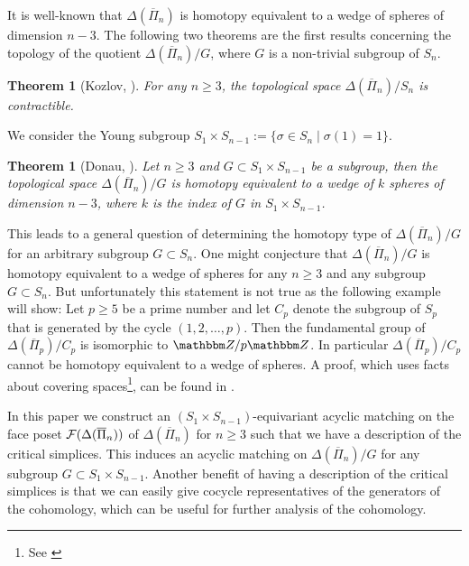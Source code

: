 \documentclass{elsarticle}
\newtheorem{thm}[df]{Theorem}
\def\Z{\mathbbm Z}
\begin{document}
It is well-known that $\Delta(\overline{\Pi}_n)$ is homotopy equivalent to a wedge of spheres of dimension $n-3$. The following two theorems are the first results concerning the topology of the quotient $\Delta(\overline{\Pi}_n)/G$, where $G$ is a non-trivial subgroup of $S_n$.
\begin{thm}[Kozlov, \cite{clmap}] %
For any $n\geq 3$, the topological space $\Delta(\overline{\Pi}_n)/S_n$ is contractible.
\end{thm}
We consider the Young subgroup $S_1\times S_{n-1}:=\{\sigma\in S_n\mid\sigma(1)=1\}$.
\begin{thm}[Donau, \cite{donau}]
\label{rdthm}
Let $n\geq3$ and $G\subset S_1\times S_{n-1}$ be a subgroup, then the topological space $\Delta(\overline{\Pi}_n)/G$ is homotopy equivalent to a wedge of $k$ spheres of dimension $n-3$, where $k$ is the index of $G$ in $S_1\times S_{n-1}$.
\end{thm}
This leads to a general question of determining the homotopy type of $\Delta(\overline{\Pi}_n)/G$ for an arbitrary subgroup $G\subset S_n$. One might conjecture that $\Delta(\overline{\Pi}_n)/G$ is homotopy equivalent to a wedge of spheres for any $n\geq 3$ and any subgroup $G\subset S_n$. But unfortunately this statement is not true as the following example will show: Let $p\geq 5$ be a prime number and let $C_p$ denote the subgroup of $S_p$ that is generated by the cycle $(1,2,\dots,p)$. Then the fundamental group of $\Delta(\overline{\Pi}_p)/C_p$ is isomorphic to $\Z/p\Z$. In particular $\Delta(\overline{\Pi}_p)/C_p$ cannot be homotopy equivalent to a wedge of spheres. A proof, which uses facts about covering spaces\footnote{See \cite[Chapter 1.3]{hatcher}}, can be found in \cite{torsion}.


In this paper we construct an $(S_1\times S_{n-1})$-equivariant acyclic matching on the face poset ${\cal F}(\Delta(\overline{\Pi}_n))$ of $\Delta(\overline{\Pi}_n)$ for $n\geq 3$ such that we have a description of the critical simplices. This induces an acyclic matching on $\Delta(\overline{\Pi}_n)/G$ for any subgroup $G\subset S_1\times S_{n-1}$. Another benefit of having a description of the critical simplices is that we can easily give cocycle representatives of the generators of the cohomology, which can be useful for further analysis of the cohomology.
\end{document}
